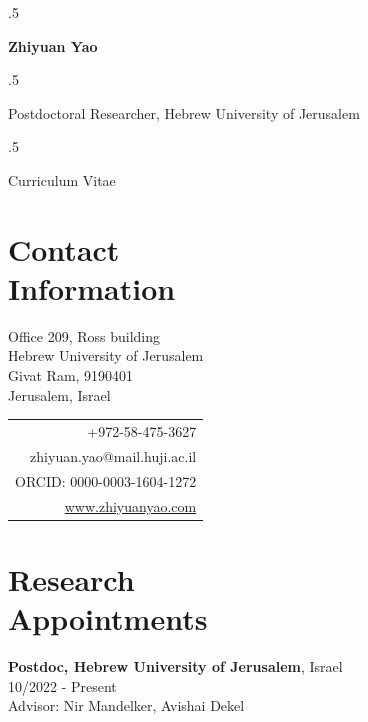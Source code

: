 \documentclass[margin, 10pt]{res} %
\begin{document}
\moveleft.5\hoffset\centerline{\Large\bf Zhiyuan Yao} %
\smallskip
\moveleft.5\hoffset\centerline{\large Postdoctoral Researcher, Hebrew University of Jerusalem}
\smallskip
\moveleft.5\hoffset\centerline{\large Curriculum Vitae}

\begin{resume}

\section{Contact \\ Information}

\begin{minipage}{0.55\textwidth}
  Office 209, Ross building\\
  Hebrew University of Jerusalem \\
  Givat Ram, 9190401 \\
  Jerusalem, Israel
\end{minipage}
\begin{minipage}{0.55\textwidth}
  \begin{tabular}{r}
    +972-58-475-3627 \\
   zhiyuan.yao@mail.huji.ac.il \\
    ORCID: 0000-0003-1604-1272 \\
    \href{https://www.zhiyuanyao.com}{www.zhiyuanyao.com} \\
  \end{tabular}
\end{minipage}

\section{Research \\ Appointments}

\textbf{Postdoc, Hebrew University of Jerusalem}, Israel\\
10/2022 - Present\\
Advisor: Nir Mandelker, Avishai Dekel


\end{resume}
\end{document}
